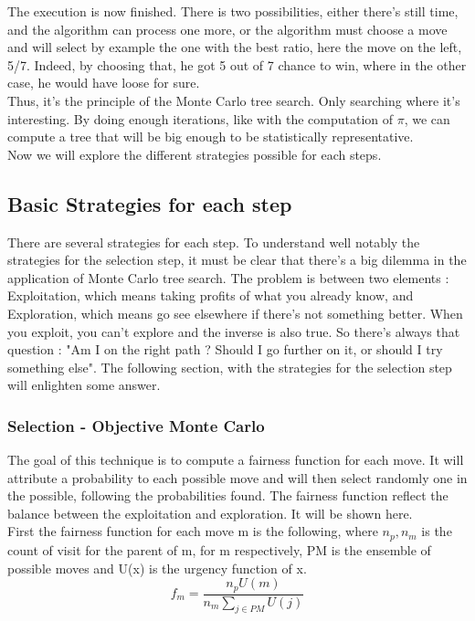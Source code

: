 The execution is now finished. There is two possibilities, either there's still time, and the algorithm can process one more, or the algorithm must choose a move and will select by example the one with the best ratio, here the move on the left, 5/7. Indeed, by choosing that, he got 5 out of 7 chance to win, where in the other case, he would have loose for sure. 
\\

Thus, it's the principle of the Monte Carlo tree search. Only searching where it's interesting. By doing enough iterations, like with the computation of $\pi$, we can compute a tree that will be big enough to be statistically representative. 
\\

Now we will explore the different strategies possible for each steps. 

\subsection{Basic Strategies for each step}

There are several strategies for each step. To understand well notably the strategies for the selection step, it must be clear that there's a big dilemma in the application of Monte Carlo tree search. The problem is between two elements : Exploitation, which means taking profits of what you already know, and Exploration, which means go see elsewhere if there's not something better. When you exploit, you can't explore and the inverse is also true. So there's always that question : "Am I on the right path ? Should I go further on it, or should I try something else". 
The following section, with the strategies for the selection step will enlighten some answer. 

\subsubsection{Selection - Objective Monte Carlo}

The goal of this technique is to compute a fairness function for each move. It will attribute a probability to each possible move and will then select randomly one in the possible, following the probabilities found. The fairness function reflect the balance between the exploitation and exploration. It will be shown here. 
\\

First the fairness function for each move m is the following, where $n_p, n_m$ is the count of visit for the parent of m, for m respectively, PM is the ensemble of possible moves and U(x) is the urgency function of x. 
$$
f_m = \frac{n_p U(m)}{n_m \sum\nolimits_{j \in PM} U(j)}
$$

